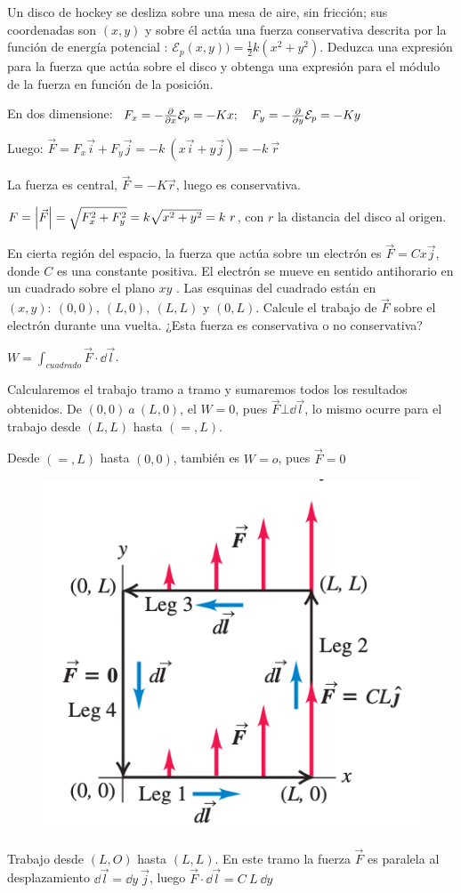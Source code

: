 \begin{prob}
Un disco de hockey se desliza sobre una mesa de aire, sin fricción; sus coordenadas son $(x,y)$ y sobre él actúa una fuerza conservativa descrita por la función de energía potencial	: $\mathcal E_p(x,y) )= \frac 1 2 k(x^2+y^2)$. Deduzca una expresión para la fuerza que actúa sobre el disco y obtenga una expresión para el módulo de la fuerza en función de la posición.
\end{prob}

En dos dimensione: $\ F_x=-\pdv{x}\mathcal E_p=-Kx; \quad F_y=-\pdv{y}\mathcal E_p=-Ky$

Luego: $\overrightarrow{F}=F_x \vec i + F_y \vec j = -k \ (x\vec i + y \vec j)=-k \ \overrightarrow{r}$

\textcolor{gris}{La fuerza es central, $\overrightarrow{F}=-K \vec r$, luego es conservativa.}

$F=\abs{\vec F}=\sqrt{F_x^2+F_y^2}=k\sqrt{x^2+y^2}=k\ r$, con $r$ la distancia del disco al origen.

\begin{prob}
En cierta región del espacio, la fuerza que actúa sobre un electrón es $\vec F=  Cx\vec j$, donde $C$ es una constante positiva. El electrón se mueve en sentido antihorario en un cuadrado sobre el plano $xy$ . Las esquinas del cuadrado están en $(x, y):\  (0, 0),\ (L, 0),\ (L, L) \text{ y } (0, L)$. Calcule el trabajo de $\vec F$ sobre el electrón durante una vuelta. ¿Esta fuerza es conservativa o no conservativa?	
\end{prob}

\begin{multicols}{2}
$W=\displaystyle \int_{cuadrado}\vec F \cdot \dd \vec l$. 

Calcularemos el trabajo tramo a tramo y sumaremos todos los resultados obtenidos.
De $(0,0)\ a \ (L,0)$, el $W=0$, pues $\vec F \bot \dd \vec l$, lo mismo ocurre para el trabajo desde $(L,L)$ hasta $(=,L)$.

Desde $(=,L)$ hasta $(0,0)$, también es $W=o$, pues $\vec F=0$
	\begin{figure}[H]
	\centering
	\includegraphics[width=.4\textwidth]{imagenes/imagenes03/T03IM53.png}
	\end{figure}
\end{multicols}
Trabajo desde $(L,O)$ hasta $(L,L)$. En este tramo la fuerza $\vec F$ es paralela al desplazamiento $\dd \vec l= \dd y\ \vec j$, luego $\vec F \cdot \dd \vec l = C\ L \ \dd y$

